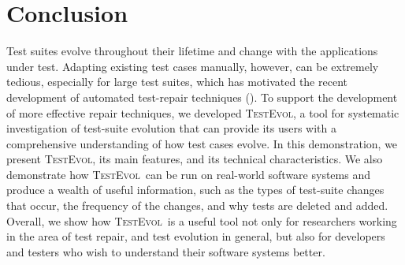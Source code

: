 \documentclass[conference]{IEEEtran}
\newcommand{\tool}{\textsc{TestEvol}\xspace}
\begin{document}
\vspace*{-8pt}
\section{Conclusion}
\label{sec:summary}

Test suites evolve throughout their lifetime and change with the
applications under test. Adapting existing test cases manually,
however, can be extremely tedious, especially for large test suites,
which has motivated the recent development of automated test-repair
techniques (\eg \cite{Daniel:2009, Daniel:2010, Mirzaaghaei:2012}).
To support the development of more effective repair techniques, we
developed \tool, a tool for systematic investigation of test-suite
evolution that can provide its users with a comprehensive
understanding of how test cases evolve. In this demonstration, we
present \tool, its main features, and its technical
characteristics. We also demonstrate how \tool\ can be run on
real-world software systems and produce a wealth of useful
information, such as the types of test-suite changes that occur, the
frequency of the changes, and why tests are deleted and added.
Overall, we show how \tool\ is a useful tool not only for researchers
working in the area of test repair, and test evolution in general, but
also for developers and testers who wish to understand their software
systems better.




{\footnotesize

}
\end{document}
